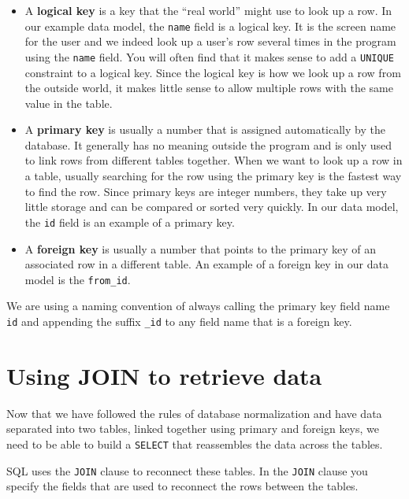 \begin{itemize}

\item A {\bf logical key} is a key that the ``real world'' might use
to look up a row.   In our example data model, the {\tt name}
field is a logical key.  It is the screen name for the user 
and we indeed look up a user's row several times in the program
using the {\tt name} field.  You will often find that it makes
sense to add a {\tt UNIQUE} constraint to a logical key.  Since the 
logical key is how we look up a row from the outside world, it makes
little sense to allow multiple rows with the same value in the table.

\item A {\bf primary key} is usually a number that is assigned
automatically by the database.  It generally has no meaning outside
the program and is only used to link rows from different tables
together.  When we want to look up a row in a table, usually 
searching for the row using the primary key is the fastest 
way to find the row.  Since primary keys are integer numbers, they 
take up very little storage and can be compared or sorted very quickly.
In our data model, the {\tt id} field is an example of a primary key.

\item A {\bf foreign key} is usually a number that points to the primary key
of an associated row in a different table.  An example of a foreign
key in our data model is the \verb"from_id".  

\end{itemize}

We are using a
naming convention of always calling the primary key field name
{\tt id} and appending the suffix \verb"_id" to any field name
that is a foreign key.


\section{Using JOIN to retrieve data}

Now that we have followed the rules of database normalization
and have data separated into two tables, linked together using
primary and foreign keys, we need to be able to build a 
{\tt SELECT} that reassembles the data across the tables.

SQL uses the {\tt JOIN} clause to reconnect these tables.  
In the {\tt JOIN} clause you specify the fields that are used 
to reconnect the rows between the tables.

